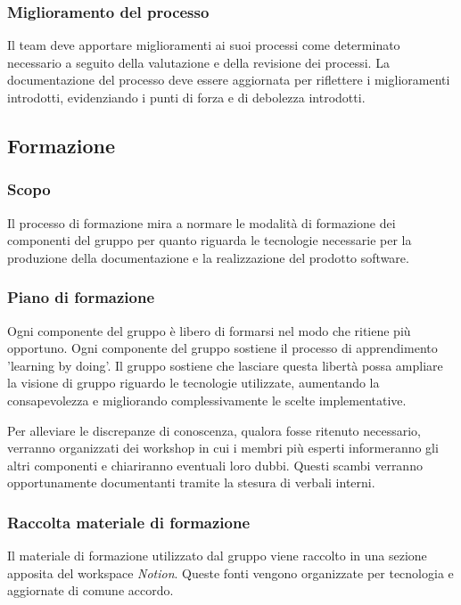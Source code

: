 \documentclass[10pt, a4paper]{article}
\begin{document}
\subsubsection{Miglioramento del processo}
Il team deve apportare miglioramenti ai suoi processi come determinato necessario a seguito della valutazione e della revisione dei processi.
La documentazione del processo deve essere aggiornata per riflettere i miglioramenti introdotti, evidenziando i punti di forza e di debolezza introdotti.

\subsection{Formazione}
\subsubsection{Scopo}
Il processo di formazione mira a normare le modalità di formazione dei componenti del gruppo per quanto riguarda le tecnologie necessarie per la produzione della documentazione e la realizzazione del prodotto software.

\subsubsection{Piano di formazione}
Ogni componente del gruppo è libero di formarsi nel modo che ritiene più opportuno.
Ogni componente del gruppo sostiene il processo di apprendimento 'learning by doing'.
Il gruppo sostiene che lasciare questa libertà possa ampliare la visione di gruppo riguardo le tecnologie utilizzate, aumentando la consapevolezza e migliorando complessivamente le scelte implementative.

Per alleviare le discrepanze di conoscenza, qualora fosse ritenuto necessario, verranno organizzati dei workshop in cui i membri più esperti informeranno gli altri componenti e chiariranno eventuali loro dubbi.
Questi scambi verranno opportunamente documentanti tramite la stesura di verbali interni.

\subsubsection{Raccolta materiale di formazione}
Il materiale di formazione utilizzato dal gruppo viene raccolto in una sezione apposita del workspace \textit{Notion}.
Queste fonti vengono organizzate per tecnologia e aggiornate di comune accordo.
\end{document}

